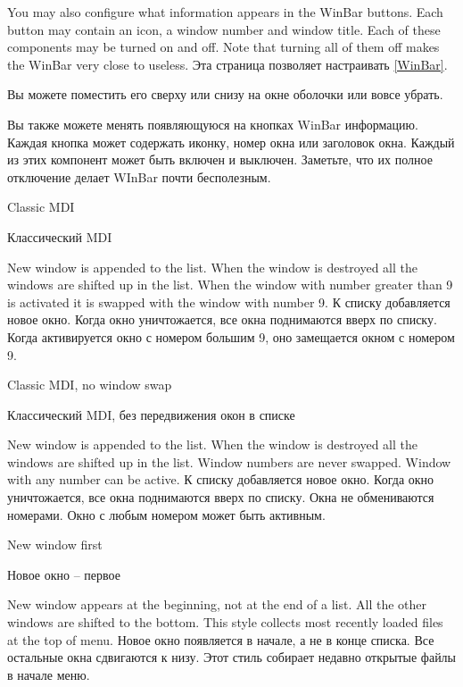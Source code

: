 You may also configure what information appears in the WinBar buttons. Each
button may contain an icon, a window number and window title. Each of these
components may be turned on and off. Note that turning all of them off makes
the WinBar very close to useless.
 \else
Эта страница позволяет настраивать \ref{WinBar}.

Вы можете поместить его сверху или снизу на окне оболочки или вовсе убрать.

Вы также можете менять появляющуюся на кнопках WinBar информацию. Каждая кнопка 
может содержать иконку, номер окна или заголовок окна. Каждый из этих компонент
может быть включен и выключен. Заметьте, что их полное отключение делает
WInBar почти бесполезным.
\fi

\begin{popup}
\ifenglish
\caption{Classic MDI}
 \else
\caption{Классический MDI}
 \fi
{}

\ifenglish
New window is appended to the list.
When the window is destroyed all the windows are shifted up in the list.
When the window with number greater than 9 is
activated it is swapped with the window with number 9.
 \else
К списку добавляется новое окно.
Когда окно уничтожается, все окна поднимаются вверх по списку.
Когда активируется окно с номером большим 9, оно замещается окном с номером 9.
\fi
\end{popup}

\begin{popup}

\ifenglish
\caption{Classic MDI, no window swap}
 \else
\caption{Классический MDI, без передвижения окон в списке}
\fi
{}

\ifenglish
New window is appended to the list.
When the window is destroyed all the windows are shifted up in the list.
Window numbers are never swapped. 
Window with any number can be active.
 \else
К списку добавляется новое окно.
Когда окно уничтожается, все окна поднимаются вверх по списку.
Окна не обмениваются номерами.
Окно с любым номером может быть активным.
\fi
\end{popup}

\begin{popup}

\ifenglish
\caption{New window first}
 \else
\caption{Новое окно -- первое}
\fi
{}

\ifenglish
New window appears at the beginning, not at the end of a list. All the other
windows are shifted to the bottom. This style collects most recently loaded
files at the top of menu.
 \else
Новое окно появляется в начале, а не в конце списка. Все остальные окна 
сдвигаются к низу. Этот стиль собирает недавно открытые файлы в начале меню.
\fi
\end{popup}

